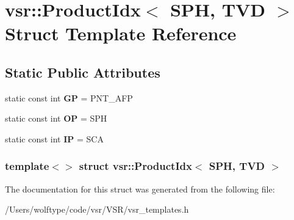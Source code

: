 \hypertarget{structvsr_1_1_product_idx_3_01_s_p_h_00_01_t_v_d_01_4}{\section{vsr\-:\-:Product\-Idx$<$ S\-P\-H, T\-V\-D $>$ Struct Template Reference}
\label{structvsr_1_1_product_idx_3_01_s_p_h_00_01_t_v_d_01_4}
}
\subsection*{Static Public Attributes}
\begin{DoxyCompactItemize}
\item 
\hypertarget{structvsr_1_1_product_idx_3_01_s_p_h_00_01_t_v_d_01_4_a19901c0fe8f631606ee0752cbd5fc4d5}{static const int {\bfseries G\-P} = P\-N\-T\-\_\-\-A\-F\-P}\label{structvsr_1_1_product_idx_3_01_s_p_h_00_01_t_v_d_01_4_a19901c0fe8f631606ee0752cbd5fc4d5}

\item 
\hypertarget{structvsr_1_1_product_idx_3_01_s_p_h_00_01_t_v_d_01_4_ad8f59bb60026dccf78cff6e9f630592a}{static const int {\bfseries O\-P} = S\-P\-H}\label{structvsr_1_1_product_idx_3_01_s_p_h_00_01_t_v_d_01_4_ad8f59bb60026dccf78cff6e9f630592a}

\item 
\hypertarget{structvsr_1_1_product_idx_3_01_s_p_h_00_01_t_v_d_01_4_a6dd8788d8998a0846ca707b0f3323de2}{static const int {\bfseries I\-P} = S\-C\-A}\label{structvsr_1_1_product_idx_3_01_s_p_h_00_01_t_v_d_01_4_a6dd8788d8998a0846ca707b0f3323de2}

\end{DoxyCompactItemize}
\subsubsection*{template$<$$>$ struct vsr\-::\-Product\-Idx$<$ S\-P\-H, T\-V\-D $>$}



The documentation for this struct was generated from the following file\-:\begin{DoxyCompactItemize}
\item 
/\-Users/wolftype/code/vsr/\-V\-S\-R/vsr\-\_\-templates.\-h\end{DoxyCompactItemize}
